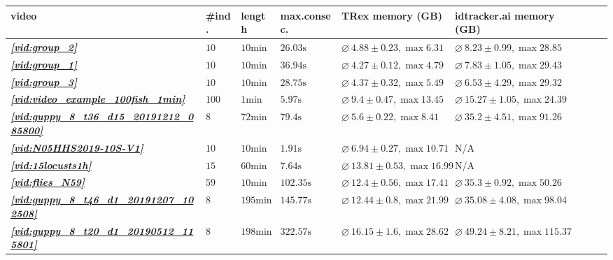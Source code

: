 \documentclass[9pt,lineno]{elife}
\newcommand{\vidref}[1]{\textit{\textbf{\ref{#1}}}}
\begin{document}
\begin{table}
\begin{tabular}{l l l l l l l l | r}
\toprule
video & \#ind. & length & max.consec.& TRex memory (GB) & idtracker.ai memory (GB)   \\
\midrule
\vidref{vid:group_2} & $10$ & $10\mathrm{min}$ & $26.03\mathrm{s}$ & $ \diameter\ 4.88\pm 0.23, \max 6.31$ & $ \diameter\ 8.23\pm 0.99, \max 28.85$ \\
\vidref{vid:group_1} & $10$ & $10\mathrm{min}$ & $36.94\mathrm{s}$ & $ \diameter\ 4.27\pm 0.12, \max 4.79$ & $ \diameter\ 7.83\pm 1.05, \max 29.43$ \\
\vidref{vid:group_3} & $10$ & $10\mathrm{min}$ & $28.75\mathrm{s}$ & $ \diameter\ 4.37\pm 0.32, \max 5.49$ & $ \diameter\ 6.53\pm 4.29, \max 29.32$ \\
\vidref{vid:video_example_100fish_1min} & $100$ & $1\mathrm{min}$ & $5.97\mathrm{s}$ & $ \diameter\ 9.4\pm 0.47, \max 13.45$ & $ \diameter\ 15.27\pm 1.05, \max 24.39$ \\
\vidref{vid:guppy_8_t36_d15_20191212_085800} & $8$ & $72\mathrm{min}$ & $79.4\mathrm{s}$ & $ \diameter\ 5.6\pm 0.22, \max 8.41$ & $ \diameter\ 35.2\pm 4.51, \max 91.26$ \\
\vidref{vid:N05HHS2019-10S-V1} & $10$ & $10\mathrm{min}$ & $1.91\mathrm{s}$ & $ \diameter\ 6.94\pm 0.27, \max 10.71$& N/A \\
\vidref{vid:15locusts1h} & $15$ & $60\mathrm{min}$ & $7.64\mathrm{s}$ & $ \diameter\ 13.81\pm 0.53, \max 16.99$& N/A \\
\vidref{vid:flies_N59} & $59$ & $10\mathrm{min}$ & $102.35\mathrm{s}$ & $ \diameter\ 12.4\pm 0.56, \max 17.41$ & $ \diameter\ 35.3\pm 0.92, \max 50.26$ \\
\vidref{vid:guppy_8_t46_d1_20191207_102508} & $8$ & $195\mathrm{min}$ & $145.77\mathrm{s}$ & $ \diameter\ 12.44\pm 0.8, \max 21.99$ & $ \diameter\ 35.08\pm 4.08, \max 98.04$ \\
\vidref{vid:guppy_8_t20_d1_20190512_115801} & $8$ & $198\mathrm{min}$ & $322.57\mathrm{s}$ & $ \diameter\ 16.15\pm 1.6, \max 28.62$ & $ \diameter\ 49.24\pm 8.21, \max 115.37$ \\

\bottomrule
\end{tabular}
\medskip 


\end{table}
\end{document}
